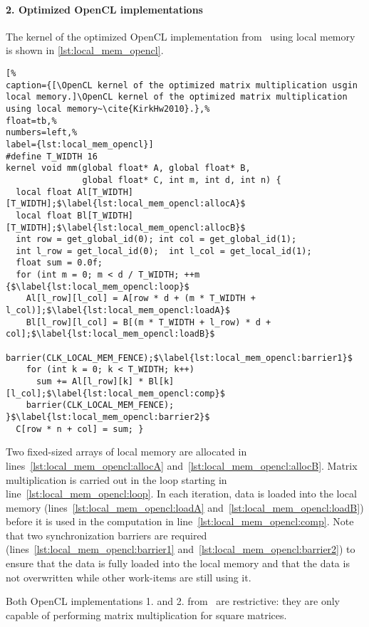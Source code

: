\paragraph{2. Optimized OpenCL implementations}
The kernel of the optimized OpenCL implementation from~\cite{KirkHw2010} using local memory is shown in \autoref{lst:local_mem_opencl}.
\begin{lstlisting}[%                                                             
caption={[\OpenCL kernel of the optimized matrix multiplication usgin local memory.]\OpenCL kernel of the optimized matrix multiplication using local memory~\cite{KirkHw2010}.},%
float=tb,%
numbers=left,%
label={lst:local_mem_opencl}]
#define T_WIDTH 16
kernel void mm(global float* A, global float* B,
               global float* C, int m, int d, int n) {
  local float Al[T_WIDTH][T_WIDTH];$\label{lst:local_mem_opencl:allocA}$
  local float Bl[T_WIDTH][T_WIDTH];$\label{lst:local_mem_opencl:allocB}$
  int row = get_global_id(0); int col = get_global_id(1);
  int l_row = get_local_id(0);  int l_col = get_local_id(1);
  float sum = 0.0f;
  for (int m = 0; m < d / T_WIDTH; ++m {$\label{lst:local_mem_opencl:loop}$
    Al[l_row][l_col] = A[row * d + (m * T_WIDTH + l_col)];$\label{lst:local_mem_opencl:loadA}$
    Bl[l_row][l_col] = B[(m * T_WIDTH + l_row) * d + col];$\label{lst:local_mem_opencl:loadB}$
    barrier(CLK_LOCAL_MEM_FENCE);$\label{lst:local_mem_opencl:barrier1}$
    for (int k = 0; k < T_WIDTH; k++)
      sum += Al[l_row][k] * Bl[k][l_col];$\label{lst:local_mem_opencl:comp}$
    barrier(CLK_LOCAL_MEM_FENCE); }$\label{lst:local_mem_opencl:barrier2}$
  C[row * n + col] = sum; }
\end{lstlisting}
Two fixed-sized arrays of local memory are allocated in lines~\ref{lst:local_mem_opencl:allocA} and~\ref{lst:local_mem_opencl:allocB}.
Matrix multiplication is carried out in the loop starting in line~\ref{lst:local_mem_opencl:loop}.
In each iteration, data is loaded into the local memory (lines~\ref{lst:local_mem_opencl:loadA} and~\ref{lst:local_mem_opencl:loadB}) before it is used in the computation in line~\ref{lst:local_mem_opencl:comp}.
Note that two synchronization barriers are required (lines~\ref{lst:local_mem_opencl:barrier1} and~\ref{lst:local_mem_opencl:barrier2}) to ensure that the data is fully loaded into the local memory and that the data is not overwritten while other work-items are still using it.

Both OpenCL implementations 1. and 2. from~\cite{KirkHw2010} are restrictive:
they are only capable of performing matrix multiplication for square matrices.

